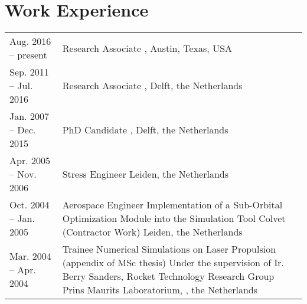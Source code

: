 \documentclass[a4paper]{article}
\newcommand{\dynhref}[2]{%
  \iftoggle{expliciturl}{%
    #2 (\href{#1}{\texttt{\detokenize{#1}}})%
  }{%
    \href{#1}{#2}%
  }%
}
\newlength{\listskipbig}
\newenvironment{cvsection}[2]{
  \vspace{0.15in}
  \section*{#1}
  \vspace{-0.2in}
  \begin{longtable}{lp{#2}}
}{
  \end{longtable}
}
\begin{document}
\begin{cvsection}{Work Experience}{10.8cm}

Aug. 2016 -- present
  & Research Associate\newline
    \dynhref{http://www.csr.utexas.edu}{Center for Space Research}, \dynhref{http://www.utexas.edu}{Texas University at Austin}\newline
    Austin, Texas, USA\\[\listskipbig]

Sep. 2011 -- Jul. 2016
  & Research Associate\newline
    \dynhref{http://www.as.lr.tudelft.nl}{Astrodynamics and Space Missions}, \dynhref{http://www.tudelft.nl/}{Delft University of Technology}\newline
    Delft, the Netherlands\\[\listskipbig]

Jan. 2007 -- Dec. 2015
  & PhD Candidate\newline
    \dynhref{http://tinyurl.com/GRS-TUDelft}{Geoscience \& Remote Sensing}, \dynhref{http://www.tudelft.nl/}{Delft University of Technology}\newline
    Delft, the Netherlands\\[\listskipbig]

Apr. 2005 -- Nov. 2006
  & Stress Engineer\newline
    \dynhref{http://www.globaltechnics.nl/}{Global Technics}\newline
    Leiden, the Netherlands\\[\listskipbig]


Oct. 2004 -- Jan. 2005
  & Aerospace Engineer\newline
  Implementation of a Sub-Orbital Optimization Module into the Simulation Tool Colvet (Contractor Work)\newline
  \dynhref{http://www.delta-utec.com/}{Delta-Utec}\newline
  Leiden, the Netherlands\\[\listskipbig]

Mar. 2004 -- Apr. 2004
  & Trainee\newline
    Numerical Simulations on Laser Propulsion (appendix of MSc thesis)\newline
    Under the supervision of Ir. Berry Sanders, Rocket Technology Research Group\newline
    Prins Maurits Laboratorium, \dynhref{http://www.tno.nl/}{TNO}, the Netherlands\\[\listskipbig]


\end{cvsection}
\end{document}
